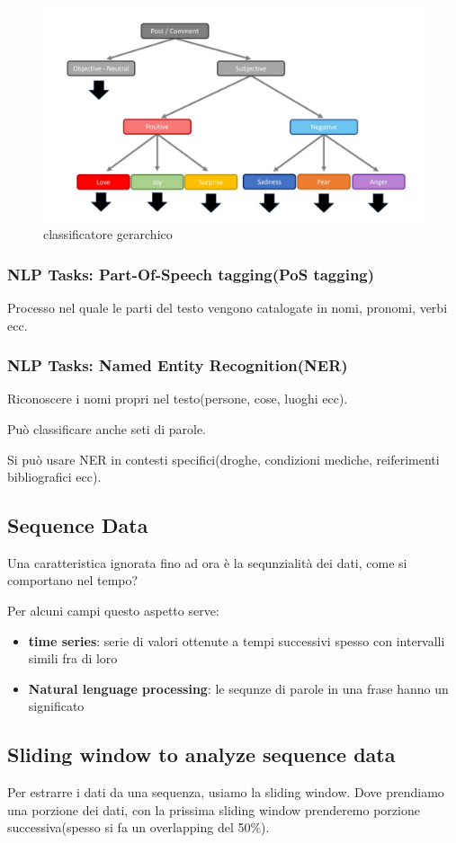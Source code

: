 \begin{figure}[H]
    \centering
    \includegraphics[width=0.4\linewidth]{imgs/classificatore-gerarchico}
    \caption{classificatore gerarchico}
    \label{fig:classificatore_gerarchico}
\end{figure}

\subsubsection{NLP Tasks: Part-Of-Speech tagging(PoS tagging)}
Processo nel quale le parti del testo vengono catalogate in nomi, pronomi, verbi ecc.

\subsubsection{NLP Tasks: Named Entity Recognition(NER)}
Riconoscere i nomi propri nel testo(persone, cose, luoghi ecc).

Può classificare anche seti di parole.

Si può usare NER in contesti specifici(droghe, condizioni mediche, reiferimenti bibliografici ecc).

\subsection{Sequence Data}

Una caratteristica ignorata fino ad ora è la sequnzialità dei dati,
come si comportano nel tempo?

Per alcuni campi questo aspetto serve:
\begin{itemize}
    \item \textbf{time series}: serie di valori ottenute a tempi successivi
    spesso con intervalli simili fra di loro
    \item \textbf{Natural lenguage processing}: le sequnze di parole in una frase hanno un significato
\end{itemize}


\subsection{Sliding window to analyze sequence data}
Per estrarre i dati da una sequenza, usiamo la sliding window.
Dove prendiamo una porzione dei dati, con la prissima sliding window prenderemo
porzione successiva(spesso si fa un overlapping del 50$\%$).

